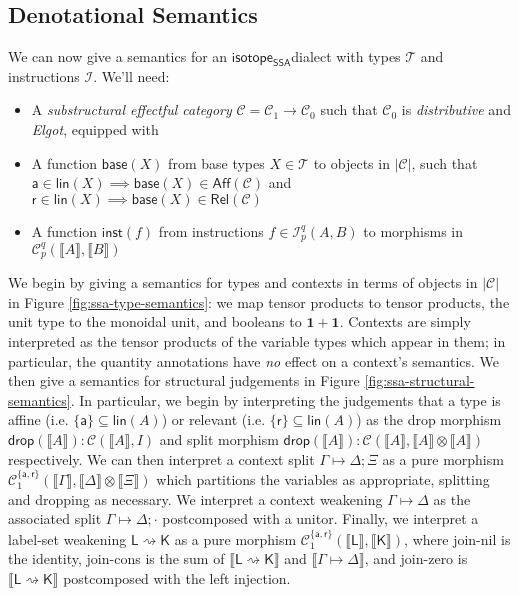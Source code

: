 \documentclass[acmsmall,screen,review]{acmart}
\newcommand{\mc}[1]{\ensuremath{\mathcal{#1}}}
\newcommand{\mb}[1]{\ensuremath{\mathbf{#1}}}
\newcommand{\ms}[1]{\ensuremath{\mathsf{#1}}}
\newcommand{\csplits}[3]{#1 \mapsto #2;#3}
\newcommand{\cwk}[2]{#1 \mapsto #2}
\newcommand{\lwk}[2]{#1 \rightsquigarrow #2}
\newcommand{\tlin}[2]{#2 \subseteq \ms{lin}(#1)}
\newcommand{\rle}[1]{{\scriptsize\textsf{#1}}}
\newcommand{\taff}{{\{\ms{a}\}}}
\newcommand{\trel}{{\{\ms{r}\}}}
\newcommand{\tint}{{\{\ms{a}, \ms{r}\}}}
\newcommand{\dnt}[1]{\llbracket{#1}\rrbracket}
\newcommand{\isotopessa}{\ms{isotope_{SSA}}}
\begin{document}
\subsection{Denotational Semantics}

We can now give a semantics for an \isotopessa dialect with types
\(\mc{T}\) and instructions \(\mc{I}\). We'll need:
\begin{itemize}
  \item A \textit{substructural effectful category} \(\mc{C} = \mc{C}_1 \to
  \mc{C}_0\) such that \(\mc{C}_0\) is \textit{distributive} and \textit{Elgot},
  equipped with
  \item A function \(\ms{base}(X)\) from base types \(X \in \mc{T}\) to objects
  in \(|\mc{C}|\), such that \(\ms{a} \in \ms{lin}(X) \implies \ms{base}(X) \in
  \ms{Aff}(\mc{C})\) and \(\ms{r} \in \ms{lin}(X) \implies \ms{base}(X) \in
  \ms{Rel}(\mc{C})\)
  \item A function \(\ms{inst}(f)\) from instructions \(f \in \mc{I}_p^q(A, B)\)
  to morphisms in \(\mc{C}_p^q(\dnt{A}, \dnt{B})\)
\end{itemize}

We begin by giving a semantics for types and contexts in terms of objects in
\(|\mc{C}|\) in Figure \ref{fig:ssa-type-semantics}: we map tensor products to
tensor products, the unit type to the monoidal unit, and booleans to \(\mb{1} +
\mb{1}\). Contexts are simply interpreted as the tensor products of the variable
types which appear in them; in particular, the quantity annotations have
\textit{no} effect on a context's semantics. We then give a semantics for
structural judgements in Figure \ref{fig:ssa-structural-semantics}. In
particular, we begin by interpreting the judgements that a type is affine (i.e.
\(\tlin{A}{\taff}\)) or relevant (i.e. \(\tlin{A}{\trel}\)) as the drop morphism
\(\ms{drop}(\dnt{A}): \mc{C}(\dnt{A}, I)\) and split morphism
\(\ms{drop}(\dnt{A}): \mc{C}(\dnt{A}, \dnt{A} \otimes \dnt{A})\) respectively.
We can then interpret a context split \(\csplits{\Gamma}{\Delta}{\Xi}\) as a
pure morphism \(\mc{C}^\tint_1(\dnt{\Gamma}, \dnt{\Delta} \otimes \dnt{\Xi})\)
which partitions the variables as appropriate, splitting and dropping as
necessary. We interpret a context weakening \(\cwk{\Gamma}{\Delta}\) as the
associated split \(\csplits{\Gamma}{\Delta}{\cdot}\) postcomposed with a unitor.
Finally, we interpret a label-set weakening \(\lwk{\ms{L}}{\ms{K}}\) as a pure
morphism \(\mc{C}^\tint_1(\dnt{\ms{L}}, \dnt{\ms{K}})\), where \rle{join-nil} is
the identity, \rle{join-cons} is the sum of \(\dnt{\lwk{\ms{L}}{\ms{K}}}\) and
\(\dnt{\cwk{\Gamma}{\Delta}}\), and \rle{join-zero} is
\(\dnt{\lwk{\ms{L}}{\ms{K}}}\) postcomposed with the left injection.
\end{document}
